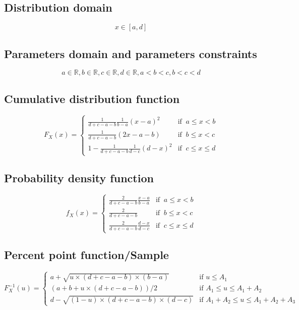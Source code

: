 \documentclass{article}
\begin{document}
\subsection{Distribution domain}
\begin{equation*} x\in\left[a,d\right] \end{equation*}
\subsection{Parameters domain and parameters constraints}
\begin{equation*} a\in\mathbb{R}, b\in\mathbb{R}, c\in\mathbb{R}, d\in\mathbb{R}, a < b < c, b < c <  d \end{equation*}
\subsection{Cumulative distribution function}
\begin{equation*} F_{X}\left(x\right)=\left\{\begin{array}{cl}\frac{1}{d+c-a-b}\frac{1}{b-a}(x-a)^2 & \text{if } \ a\leq x < b \\ \frac{1}{d+c-a-b}(2x-a-b) & \text{if } \ b\leq x < c \\ 1-\frac{1}{d+c-a-b}\frac{1}{d-c}(d-x)^2 & \text{if } \ c\leq x \le d \end{array} \right. \end{equation*}
\subsection{Probability density function}
\begin{equation*} f_{X}\left(x\right)=\left\{\begin{array}{cl}\frac{2}{d+c-a-b}\frac{x-a}{b-a} & \text{if } \ a\leq x < b \\ \frac{2}{d+c-a-b} & \text{if } \ b\leq x < c \\ \frac{2}{d+c-a-b}\frac{d-x}{d-c} & \text{if } \ c\leq x \leq d \end{array} \right. \end{equation*}
\subsection{Percent point function/Sample}
\begin{equation*} F^{-1}_{X}\left(u\right)=\left\{\begin{array}{cl} a+\sqrt{u\times (d+c-a-b)\times (b-a)} & \text{if } u \leq A_{1} \\ (a+b+u\times (d+c-a-b))/2 & \text{if } A_{1} \leq u \leq A_{1}+A_{2} \\ d-\sqrt{(1-u)\times (d+c-a-b)\times (d-c)} & \text{if } A_{1}+A_{2} \leq u \leq A_{1}+A_{2}+A_{3}  \end{array} \right. \end{equation*}
\end{document}
